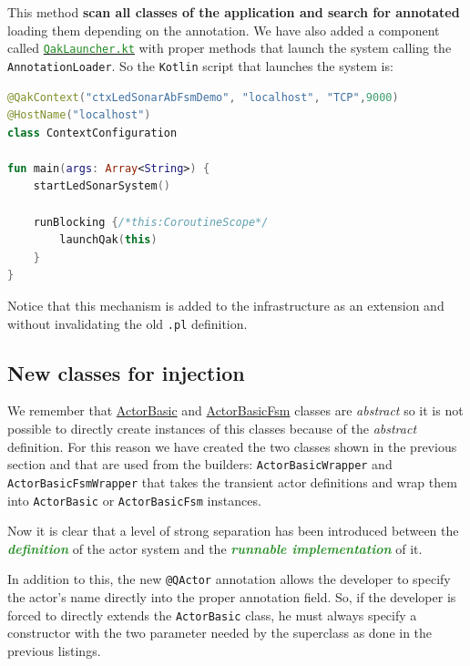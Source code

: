 This method \textbf{scan all classes of the application and search for annotated} loading them depending on the annotation. We have also added a component called \href{https://github.com/LM-96/QA-Extensions/blob/main/it.unibo.qakactor/src/main/kotlin/QakLauncher.kt}{\textcolor{ForestGreen}{\texttt{QakLauncher.kt}}} with proper methods that launch the system calling the \texttt{AnnotationLoader}. So the \texttt{Kotlin} script that launches the system is:

\begin{lstlisting}[caption=\texttt{App.kt} (\texttt{ledsonarsystem0}), language=Kotlin]
@QakContext("ctxLedSonarAbFsmDemo", "localhost", "TCP",9000)
@HostName("localhost")
class ContextConfiguration

fun main(args: Array<String>) {
	startLedSonarSystem()
	
	runBlocking {/*this:CoroutineScope*/
		launchQak(this)
	}
}
\end{lstlisting}

Notice that this mechanism is added to the infrastructure as an extension and without invalidating the old \texttt{.pl} definition. 

\subsection{New classes for injection}

We remember that \href{https://github.com/anatali/issLab2021/blob/main/it.unibo.qakactor/src/main/kotlin/ActorBasic.kt}{ActorBasic} and \href{https://github.com/anatali/issLab2021/blob/main/it.unibo.qakactor/src/main/kotlin/ActorBasicFsm.kt}{ActorBasicFsm} classes are \textit{abstract} so it is not possible to directly create instances of this classes because of the \textit{abstract} definition.
For this reason we have created the two classes shown in the previous section and that are used from the builders: \texttt{ActorBasicWrapper} and \texttt{ActorBasicFsmWrapper} that takes the transient actor definitions and wrap them into \texttt{ActorBasic} or \texttt{ActorBasicFsm} instances.

Now it is clear that a level of strong separation has been introduced between the \textcolor{ForestGreen}{\textbf{\textit{definition}}} of the actor system and the \textcolor{ForestGreen}{\textbf{\textit{runnable implementation}}} of it.

In addition to this, the new \texttt{@QActor} annotation allows the developer to specify the actor's name directly into the proper annotation field. So, if the developer is forced to directly extends the \texttt{ActorBasic} class, he must always specify a constructor with the two parameter needed by the superclass as done in the previous listings.

